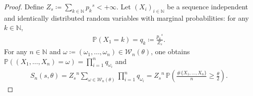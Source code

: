 \documentclass[12pt,reqno]{amsart}
\theoremstyle{definition}
\theoremstyle{plain}
\begin{document}
\begin{proof}
Define $Z_s\coloneqq \sum_{k\in\mathbb{N}} {p_k}^{s}<+\infty$. Let $(X_i)_{i\in\mathbb{{N}}}$ be a sequence independent and identically distributed random variables with marginal probabilities: for any $k\in\mathbb{N}$, 
\begin{align*}
    \mathbb{P}(X_1=k)=q_k\coloneqq \frac{{p_k}^{s}}{Z_s}.
\end{align*}
For any $n\in\mathbb{N}$ and $\omega\coloneqq(\omega_1,\ldots,\omega_n)\in\mathcal{W}_n(\theta)$, one obtains $\mathbb P((X_1,\ldots,X_n)=\omega)=\prod_{i=1}^n q_{\omega_i}$ and
\begin{align}
\label{eq:tilt}
    S_n(s,\theta)
    ={Z_s}^n\sum_{\omega\in\mathcal{W}_n(\theta)}\prod_{i=1}^nq_{\omega_i}
    ={Z_s}^n\,\mathbb{P}\left(\frac{\#\{X_1,\ldots,X_n\}}{n}\geq \frac{\theta}{2}\right).
\end{align}


\end{proof}
\end{document}
